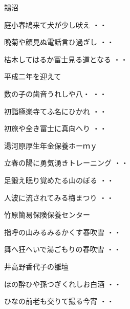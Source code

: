 鵠沼
\begin{shiika}庭小春鳩来て犬が少し吠え
\hfill{・・}\end{shiika}
\begin{shiika}晩菊や顔見ぬ電話言ひ過ぎし
\hfill{・・}\end{shiika}
\begin{shiika}枯木してはるか冨士見る道となる
\hfill{・・}\end{shiika}
\vspace{0.6cm}
平成二年を迎えて
\begin{shiika}数の子の歯音うれしや八・
\hfill{・・}\end{shiika}
\begin{shiika}初詣極楽寺てふ名にひかれ
\hfill{・・}\end{shiika}
\begin{shiika}初旅や全き冨士に真向へり
\hfill{・・}\end{shiika}
\vspace{0.6cm}
湯河原厚生年金保養ホーｍｙ
\begin{shiika}立春の陽に勇気湧きトレーニング
\hfill{・・}\end{shiika}
\begin{shiika}足鍛え眠り覚めたる山のぼる
\hfill{・・}\end{shiika}
\begin{shiika}人波に流されてみる梅まつり
\hfill{・・}\end{shiika}
\vspace{0.6cm}
竹原簡易保険保養センター
\begin{shiika}指呼の山みるみるかくす春吹雪
\hfill{・・}\end{shiika}
\begin{shiika}舞へ狂へいで湯ごもりの春吹雪
\hfill{・・}\end{shiika}
\vspace{0.6cm}
井高野香代子の雛壇
\begin{shiika}ほの酔ひや孫つぎくれしお白酒
\hfill{・・}\end{shiika}
\begin{shiika}ひなの前老も交りて撮る今宵
\hfill{・・}\end{shiika}
